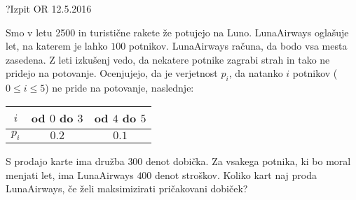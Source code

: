 \begin{naloga}{?}{Izpit OR 12.5.2016}
\begin{vprasanje}
Smo v letu 2500 in turistične rakete že potujejo na Luno.
LunaAirways oglašuje let, na katerem je lahko $100$ potnikov.
LunaAirways računa, da bodo vsa mesta zasedena.
Z leti izkušenj vedo,
da nekatere potnike zagrabi strah in tako ne pridejo na potovanje.
Ocenjujejo, da je verjetnost $p_i$,
da natanko $i$ potnikov ($0 \le i \le 5$) ne pride na potovanje,
naslednje:
\begin{center}
\begin{tabular}{c|cc}
$i$ & od $0$ do $3$ & od $4$ do $5$ \\ \hline
$p_i$ & $0.2$ & $0.1$
\end{tabular}
\end{center}

S prodajo karte ima družba $300$ denot dobička.
Za vsakega potnika, ki bo moral menjati let,
ima LunaAirways $400$ denot stroškov.
Koliko kart naj proda LunaAirways, če želi maksimizirati pričakovani dobiček?
\end{vprasanje}
\begin{odgovor}
\end{odgovor}
\end{naloga}

